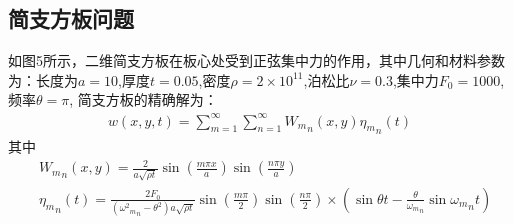 \documentclass[11pt,a4paper]{article}
\begin{document}
\subsection{简支方板问题}
如图5所示，二维简支方板在板心处受到正弦集中力的作用，其中几何和材料参数为：长度为$a=10$,厚度$t=0.05$,密度$\rho=2\times 10^{11}$,泊松比$\nu=0.3$,集中力$F_0=1000$,频率$\theta=\pi$,
简支方板的精确解为：
\begin{equation}
\begin{split}
    w (x,y,t) = \mathop \sum \limits_{m = 1}^\infty  \mathop \sum \limits_{n = 1}^\infty  {W_m}_n(x,y){\eta _m}_n(t) 
\end{split}
\end{equation}
其中
\begin{equation}
\begin{split}
&{W_m}_n(x,y) = \frac{2}{{a\sqrt {\rho t} }}\sin (\frac{{m\pi x}}{a})\sin (\frac{{n\pi y}}{a})\\
&{\eta _m}_n(t) = \frac{{2{F_0}}}{{({\omega ^2}{{_m}_n} - {\theta ^2})a\sqrt {\rho t} }}\sin (\frac{{m\pi }}{2})\sin (\frac{{n\pi }}{2}) \times (\sin \theta t - \frac{\theta }{{{\omega _m}_n}}\sin {\omega _m}_nt)
\end{split}
\end{equation}
\end{document}
